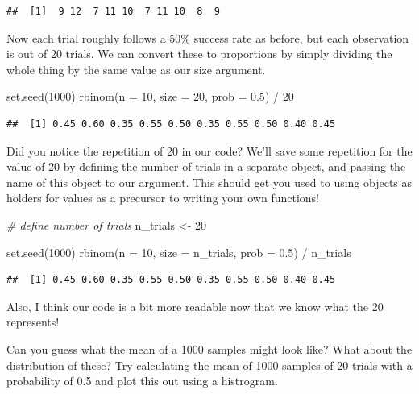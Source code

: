 \documentclass[
]{book}
\newenvironment{Shaded}{\begin{snugshade}}{\end{snugshade}}
\newcommand{\AttributeTok}[1]{\textcolor[rgb]{0.77,0.63,0.00}{#1}}
\newcommand{\CommentTok}[1]{\textcolor[rgb]{0.56,0.35,0.01}{\textit{#1}}}
\newcommand{\DecValTok}[1]{\textcolor[rgb]{0.00,0.00,0.81}{#1}}
\newcommand{\FloatTok}[1]{\textcolor[rgb]{0.00,0.00,0.81}{#1}}
\newcommand{\FunctionTok}[1]{\textcolor[rgb]{0.00,0.00,0.00}{#1}}
\newcommand{\NormalTok}[1]{#1}
\newcommand{\OtherTok}[1]{\textcolor[rgb]{0.56,0.35,0.01}{#1}}
\newcommand{\SpecialCharTok}[1]{\textcolor[rgb]{0.00,0.00,0.00}{#1}}
\begin{document}
\begin{verbatim}
##  [1]  9 12  7 11 10  7 11 10  8  9
\end{verbatim}

Now each trial roughly follows a 50\% success rate as before, but each observation is out of 20 trials. We can convert these to proportions by simply dividing the whole thing by the same value as our size argument.

\begin{Shaded}
\begin{Highlighting}[]
\FunctionTok{set.seed}\NormalTok{(}\DecValTok{1000}\NormalTok{)}
\FunctionTok{rbinom}\NormalTok{(}\AttributeTok{n =} \DecValTok{10}\NormalTok{, }\AttributeTok{size =} \DecValTok{20}\NormalTok{, }\AttributeTok{prob =} \FloatTok{0.5}\NormalTok{) }\SpecialCharTok{/} \DecValTok{20}
\end{Highlighting}
\end{Shaded}

\begin{verbatim}
##  [1] 0.45 0.60 0.35 0.55 0.50 0.35 0.55 0.50 0.40 0.45
\end{verbatim}

Did you notice the repetition of 20 in our code? We'll save some repetition for the value of 20 by defining the number of trials in a separate object, and passing the name of this object to our argument. This should get you used to using objects as holders for values as a precursor to writing your own functions!

\begin{Shaded}
\begin{Highlighting}[]
\CommentTok{\# define number of trials}
\NormalTok{n\_trials }\OtherTok{\textless{}{-}} \DecValTok{20}

\FunctionTok{set.seed}\NormalTok{(}\DecValTok{1000}\NormalTok{)}
\FunctionTok{rbinom}\NormalTok{(}\AttributeTok{n =} \DecValTok{10}\NormalTok{, }\AttributeTok{size =}\NormalTok{ n\_trials, }\AttributeTok{prob =} \FloatTok{0.5}\NormalTok{) }\SpecialCharTok{/}\NormalTok{ n\_trials}
\end{Highlighting}
\end{Shaded}

\begin{verbatim}
##  [1] 0.45 0.60 0.35 0.55 0.50 0.35 0.55 0.50 0.40 0.45
\end{verbatim}

Also, I think our code is a bit more readable now that we know what the 20 represents!

Can you guess what the mean of a 1000 samples might look like? What about the distribution of these? Try calculating the mean of 1000 samples of 20 trials with a probability of 0.5 and plot this out using a histrogram.
\end{document}
